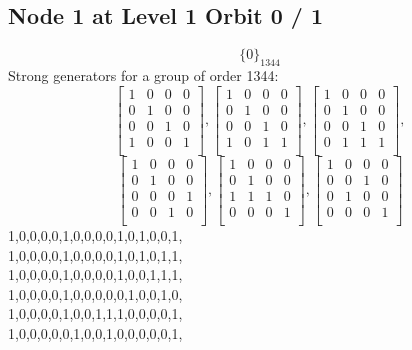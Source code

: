 \subsection*{Node 1 at Level 1 Orbit 0 / 1}
$$
\{ 0 \}_{1344}$$
{\small\arraycolsep=2pt
Strong generators for a group of order 1344:
$$
\left[
\begin{array}{*{4}{r}}
1 & 0 & 0 & 0\\
0 & 1 & 0 & 0\\
0 & 0 & 1 & 0\\
1 & 0 & 0 & 1\\
\end{array}
\right]
, 
\left[
\begin{array}{*{4}{r}}
1 & 0 & 0 & 0\\
0 & 1 & 0 & 0\\
0 & 0 & 1 & 0\\
1 & 0 & 1 & 1\\
\end{array}
\right]
, 
\left[
\begin{array}{*{4}{r}}
1 & 0 & 0 & 0\\
0 & 1 & 0 & 0\\
0 & 0 & 1 & 0\\
0 & 1 & 1 & 1\\
\end{array}
\right]
, 
$$
$$
\left[
\begin{array}{*{4}{r}}
1 & 0 & 0 & 0\\
0 & 1 & 0 & 0\\
0 & 0 & 0 & 1\\
0 & 0 & 1 & 0\\
\end{array}
\right]
, 
\left[
\begin{array}{*{4}{r}}
1 & 0 & 0 & 0\\
0 & 1 & 0 & 0\\
1 & 1 & 1 & 0\\
0 & 0 & 0 & 1\\
\end{array}
\right]
, 
\left[
\begin{array}{*{4}{r}}
1 & 0 & 0 & 0\\
0 & 0 & 1 & 0\\
0 & 1 & 0 & 0\\
0 & 0 & 0 & 1\\
\end{array}
\right]
$$
1,0,0,0,0,1,0,0,0,0,1,0,1,0,0,1,\\
1,0,0,0,0,1,0,0,0,0,1,0,1,0,1,1,\\
1,0,0,0,0,1,0,0,0,0,1,0,0,1,1,1,\\
1,0,0,0,0,1,0,0,0,0,0,1,0,0,1,0,\\
1,0,0,0,0,1,0,0,1,1,1,0,0,0,0,1,\\
1,0,0,0,0,0,1,0,0,1,0,0,0,0,0,1,\\
}
